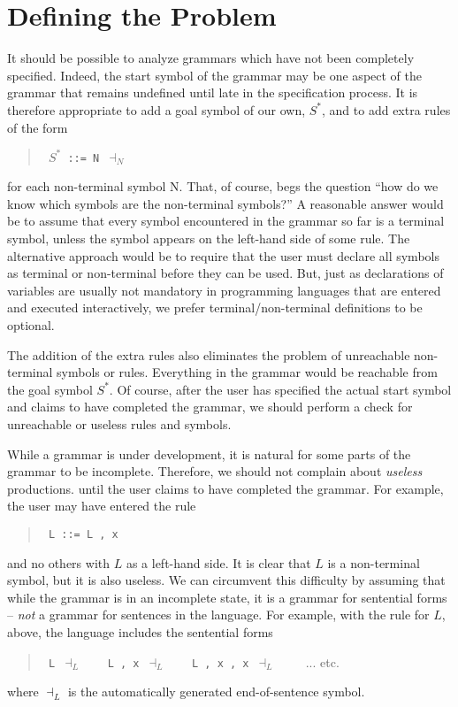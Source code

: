 \section{Defining the Problem}

It should be possible to analyze grammars which have not been completely
specified.
Indeed, the start symbol of the grammar may be one aspect of the
grammar that remains undefined until late in the specification process.
It is therefore appropriate to add a goal symbol of our own, $S^*$,
and to add extra rules of the form
\begin{quote}
\tt
$S^*$  ::=  N  $\dashv_N$
\end{quote}
for each non-terminal symbol N.
That, of course, begs the question ``how do we know which symbols
are the non-terminal symbols?''
A reasonable answer would be to assume that every symbol encountered
in the grammar so far is a terminal symbol, unless the symbol appears
on the left-hand side of some rule.
The alternative approach would be to require that the user must declare
all symbols as terminal or non-terminal before they can be used.
But, just as declarations of variables are usually not mandatory in
programming languages that are entered and executed interactively,
we prefer terminal/non-terminal definitions to be optional.

The addition of the extra rules also eliminates the problem of unreachable
non-terminal symbols or rules.
Everything in the grammar would be reachable from the goal symbol $S^*$.
Of course, after the user has specified the actual start symbol and claims
to have completed the grammar, we should perform a check for unreachable
or useless rules and symbols.

While a grammar is under development, it is natural for some parts of
the grammar to be incomplete.
Therefore, we should not complain about {\em useless} productions.
until the user claims to have completed the grammar.
For example, the user may have entered the rule
\begin{quote}
\tt
L  ::=  L  ,  x
\end{quote}
and no others with $L$ as a left-hand side.
It is clear that $L$ is a non-terminal symbol, but it is also useless.
We can circumvent this difficulty by assuming that while the grammar is
in an incomplete state, it is a grammar for sentential forms --
{\em not} a grammar for sentences in the language.
For example, with the rule for $L$, above, the language includes the
sentential forms
\begin{quote}
{\tt
L $\dashv_L$\ \ \ \ L , x $\dashv_L$\ \ \ \ L , x , x $\dashv_L$\ \ \ \ }
... etc.
\end{quote}
where $\dashv_L$ is the automatically generated end-of-sentence symbol.

